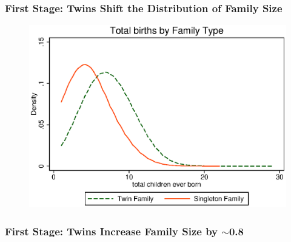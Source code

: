 \documentclass[9pt,letterpaper,subeqn]{beamer}
\begin{document}
\begin{frame}[label=FS1]
\frametitle{First Stage: Twins Shift the Distribution of Family Size}
\begin{figure}[htpb!]
\centering
  \includegraphics[scale=0.75]{./figures/famsize.eps}
\end{figure}
\end{frame}

\begin{frame}[label=Fstage]
\frametitle{First Stage: Twins Increase Family Size by $\sim$0.8}

\end{frame}



\begin{frame}[label=IV]

\end{frame}




\begin{frame}[label=USAIV]

\end{frame}

\end{document}
